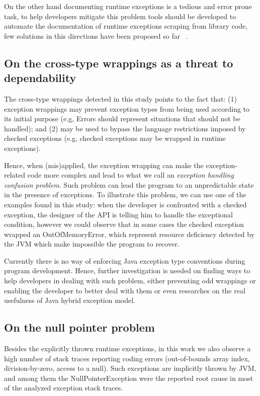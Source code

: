 \documentclass[conference]{IEEEtran}
\begin{document}
On the other hand documenting runtime exceptions is a tedious and error prone task, to help developers
mitigate this problem tools should be developed to automate the documentation of runtime exceptions
scraping from library code, few solutions in this directions have been proposed so far ~\cite{van2005combining}. 

\subsection{On the cross-type wrappings as a threat to dependability}
The cross-type wrappings detected in this study points to the fact that: (1) exception 
wrappings may prevent exception types from being used according to its initial purpose
 (e.g, Errors should represent situations that should not be handled); and (2) may  be used
 to bypass the language restrictions imposed by checked exceptions  (e.g,
 checked exceptions may be wrapped in runtime exceptions).

Hence, when (mis)applied, the exception wrapping can make the exception-related code
 more complex and lead to what we call an \emph{exception handling confusion problem}.
Such problem can lead the program to
an unpredictable state in the presence of exceptions. To illustrate this problem, we can use
 one of the examples found in this study: when the developer is 
confronted with a checked exception, the designer of the API is telling him 
to handle the exceptional condition, however we could observe that in some cases the 
checked exception wrapped an OutOfMemoryError, which represent resource deficiency detected 
by the JVM which make impossible the program to recover. 

Currently there is no way of enforcing Java exception type conventions during program development.
Hence, further investigation is needed on finding ways to help developers in dealing with such
 problem, either preventing odd wrappings or enabling the developer to better deal with them or even
researches on the real usefulness of Java hybrid exception model. 


\subsection{On the null pointer problem}

Besides the explicitly thrown runtime exceptions, in this work we also observe a high number of 
stack traces reporting coding errors (out-of-bounds array index, division-by-zero, access to a null).
Such exceptions are implicitly thrown by JVM, and among them the NullPointerException 
were the reported root cause in most of the analyzed exception stack traces.
\end{document}
